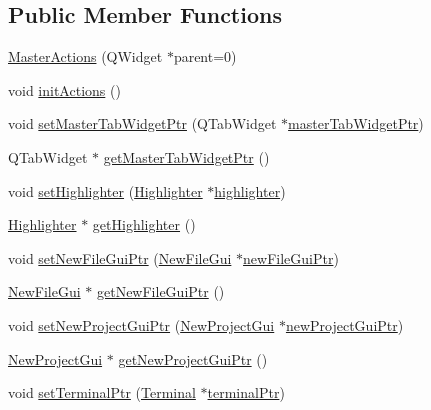 \subsection*{Public Member Functions}
\begin{DoxyCompactItemize}
\item 
\hyperlink{class_master_actions_ad8eb348b90e75f5876c30692930a2c22}{Master\-Actions} (Q\-Widget $\ast$parent=0)
\item 
void \hyperlink{class_master_actions_a9e2ff3903452d1212d530e20af9d7936}{init\-Actions} ()
\item 
void \hyperlink{class_master_actions_aaa47a0a38ad7b5e95081417b129bbc63}{set\-Master\-Tab\-Widget\-Ptr} (Q\-Tab\-Widget $\ast$\hyperlink{class_master_actions_a774ef398053050c37d62b7a24e61c7ee}{master\-Tab\-Widget\-Ptr})
\item 
Q\-Tab\-Widget $\ast$ \hyperlink{class_master_actions_a10e5735225e146bd19d09f3fc1244a32}{get\-Master\-Tab\-Widget\-Ptr} ()
\item 
void \hyperlink{class_master_actions_ae5856ce1f1a1d1f83622631512638dd8}{set\-Highlighter} (\hyperlink{class_highlighter}{Highlighter} $\ast$\hyperlink{class_master_actions_a50b1565db8b7780ec4e88e59953aa67b}{highlighter})
\item 
\hyperlink{class_highlighter}{Highlighter} $\ast$ \hyperlink{class_master_actions_a2b609608d4fdfe1f4abc4ba386e58923}{get\-Highlighter} ()
\item 
void \hyperlink{class_master_actions_a4fde279b855381679703cac9037deb08}{set\-New\-File\-Gui\-Ptr} (\hyperlink{class_new_file_gui}{New\-File\-Gui} $\ast$\hyperlink{class_master_actions_a8839c174acf071c0d9bfe450160218eb}{new\-File\-Gui\-Ptr})
\item 
\hyperlink{class_new_file_gui}{New\-File\-Gui} $\ast$ \hyperlink{class_master_actions_acb2a5079f7000c89fd0817db3ba46040}{get\-New\-File\-Gui\-Ptr} ()
\item 
void \hyperlink{class_master_actions_a4d26f5e2d62c71b71c4a198326b241f1}{set\-New\-Project\-Gui\-Ptr} (\hyperlink{class_new_project_gui}{New\-Project\-Gui} $\ast$\hyperlink{class_master_actions_a78733336a3d5fd3bbb55eaf0215f0d40}{new\-Project\-Gui\-Ptr})
\item 
\hyperlink{class_new_project_gui}{New\-Project\-Gui} $\ast$ \hyperlink{class_master_actions_a30b51649f46b8f105f8be5d9b4a6fb5f}{get\-New\-Project\-Gui\-Ptr} ()
\item 
void \hyperlink{class_master_actions_a9a65dcf1c8e292712de196eabbaa9952}{set\-Terminal\-Ptr} (\hyperlink{class_terminal}{Terminal} $\ast$\hyperlink{class_master_actions_accb886e749ad46cb6373187e59921bcf}{terminal\-Ptr})

\end{DoxyCompactItemize}

